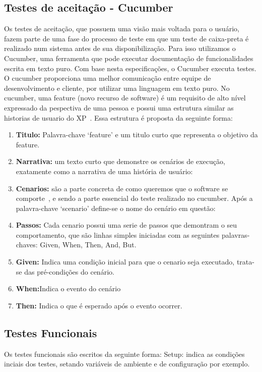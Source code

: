 \subsection{Testes de aceitação - Cucumber}
Os testes de aceitação, que possuem uma visão mais voltada para o usuário, fazem 
parte de uma fase do processo de teste em que um teste de caixa-preta é realizado 
num sistema antes de sua disponibilização. Para isso utilizamos o Cucumber, uma 
ferramenta que pode executar documentação de funcionalidades escrita em texto puro. 
Com base nesta especificações, o Cucumber executa testes.
%
O cucumber proporciona uma melhor comunicação entre equipe de desenvolvimento e 
cliente, por utilizar uma linguagem  em texto puro.
%
No cucumber, uma feature (novo recurso de software) é um requisito de alto nível 
expressado da pespectiva de uma pessoa e possui uma estrutura similar as historias 
de usuario do XP~\cite{chelimsky2010}. Essa estrutura é proposta da seguinte forma:
\begin{enumerate}
\item \textbf{Titulo:} Palavra-chave ‘feature’ e um titulo curto que representa o 
objetivo da feature.
\item \textbf{Narrativa:} um texto curto que demonstre os cenários de execução, 
exatamente como a narrativa de uma história de usuário:
%
\item \textbf{Cenarios:} são a parte concreta de como queremos que o software se 
comporte~\cite{chelimsky2010}, e sendo a parte essencial do teste realizado no 
cucumber. Após a palavra-chave ‘scenario’ define-se o nome do cenário em questão:
%
\item \textbf{Passos:} Cada cenario possui uma serie de passos que demontram o seu 
comportamento, que são linhas simples iniciadas com as seguintes palavras-chaves: 
Given, When, Then, And, But.
\item \textbf{Given:} Indica uma condição inicial para que o cenario seja executado, 
trata-se das pré-condições do cenário.
\item \textbf{When:}Indica o evento do cenário
\item \textbf{Then:} Indica o que é esperado após o evento ocorrer.
\end{enumerate}
\subsection{Testes Funcionais}
%
Os testes funcionais são escritos da seguinte forma:
%
Setup: indica as condições inciais dos testes, setando variáveis de ambiente e de 
configuração por exemplo.


